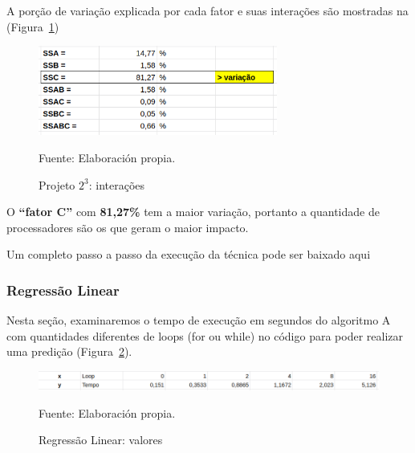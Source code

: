\documentclass[12pt]{article}
\begin{document}
A porção de variação explicada por cada fator e suas interações são mostradas na (Figura~\ref{figure:projeto_2_interacoes})

\begin{figure}[!ht]
	\begin{center}
		\includegraphics[width=0.7\textwidth]{images/projeto_2_interacoes}
	\end{center}
	\begin{center}
		\caption{\label{figure:projeto_2_interacoes}
			\small{Projeto ${2^3}$: interações}}
		{\small{Fuente: Elaboración propia.}}
	\end{center}
\end{figure}
	
O \textbf{``fator C''} com \textbf{81,27\%} tem a maior variação, portanto a quantidade de processadores são os que geram o maior impacto. 

Um completo passo a passo da execução da técnica pode ser baixado aqui 

\subsubsection{Regressão Linear}

Nesta seção, examinaremos o tempo de execução em segundos do algoritmo A com quantidades diferentes de loops (for ou while) no código para poder realizar uma predição (Figura~\ref{figure:regressao_valores}).

\begin{figure}[!ht]
	\begin{center}
		\includegraphics[width=1\textwidth]{images/regressao_valores}
	\end{center}
	\begin{center}
		\caption{\label{figure:regressao_valores}
			\small{Regressão Linear: valores}}
		{\small{Fuente: Elaboración propia.}}
	\end{center}
\end{figure}
\end{document}
